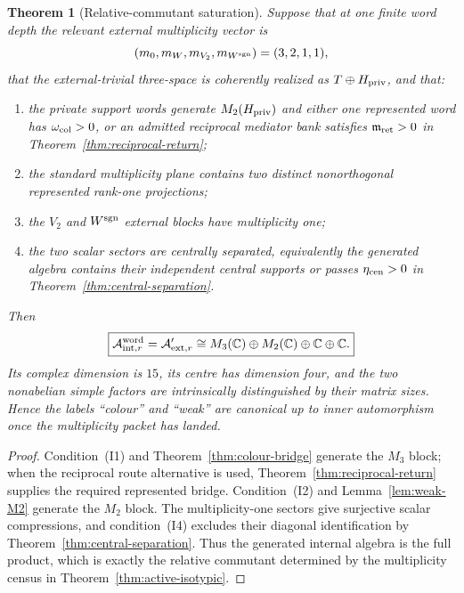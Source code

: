 \documentclass[11pt]{article}
\newtheorem{theorem}{Theorem}[section]
\theoremstyle{definition}
\theoremstyle{remark}
\newcommand{\C}{\mathbb C}
\newcommand{\A}{\mathcal A}
\begin{document}
\begin{theorem}[Relative-commutant saturation]
\label{thm:internal-seed-saturation}
Suppose that at one finite word depth the relevant external multiplicity
vector is
\begin{equation}
(m_0,m_W,m_{V_2},m_{W^{\rm sgn}})=(3,2,1,1),
\label{eq:SM-multiplicity-census}
\end{equation}
that the external-trivial three-space is coherently realized as
$T\oplus H_{\rm priv}$, and that:
\begin{enumerate}[label=\textup{(I\arabic*)},leftmargin=3em]
\item the private support words generate $M_2(H_{\rm priv})$ and either one
      represented word has $\omega_{\rm col}>0$, or an admitted reciprocal
      mediator bank satisfies $\mathfrak m_{\rm ret}>0$ in
      Theorem~\ref{thm:reciprocal-return};
\item the standard multiplicity plane contains two distinct nonorthogonal
      represented rank-one projections;
\item the $V_2$ and $W^{\rm sgn}$ external blocks have multiplicity one;
\item the two scalar sectors are centrally separated, equivalently the
      generated algebra contains their independent central supports or passes
      $\eta_{\rm cen}>0$ in Theorem~\ref{thm:central-separation}.
\end{enumerate}
Then
\begin{equation}
\boxed{
\A_{{\rm int},r}^{\rm word}
=
\A_{{\rm ext},r}'
\cong
M_3(\C)\oplus M_2(\C)\oplus\C\oplus\C.}
\label{eq:active-internal-algebra}
\end{equation}
Its complex dimension is $15$, its centre has dimension four, and the two
nonabelian simple factors are intrinsically distinguished by their matrix
sizes.  Hence the labels ``colour'' and ``weak'' are canonical up to inner
automorphism once the multiplicity packet has landed.
\end{theorem}

\begin{proof}
Condition~\textup{(I1)} and Theorem~\ref{thm:colour-bridge} generate the
$M_3$ block; when the reciprocal route alternative is used,
Theorem~\ref{thm:reciprocal-return} supplies the required represented bridge.
Condition~\textup{(I2)} and Lemma~\ref{lem:weak-M2} generate the $M_2$ block.
The multiplicity-one sectors give surjective scalar compressions, and
condition~\textup{(I4)} excludes their diagonal identification by
Theorem~\ref{thm:central-separation}.  Thus the generated internal algebra is
the full product, which is exactly the relative commutant determined by the
multiplicity census in Theorem~\ref{thm:active-isotypic}.
\end{proof}
\end{document}

